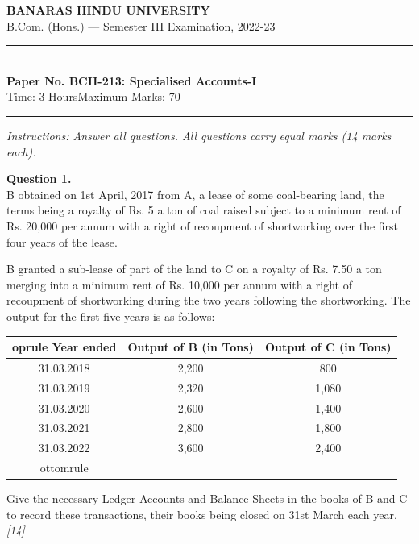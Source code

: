 \documentclass[11pt,a4paper]{article}
\newcommand{\pts}[1]{\hfill   \textit{[#1]}}
\begin{document}
\begin{center}
  {\large\bfseries BANARAS HINDU UNIVERSITY}\\[2pt]
  {\normalsize B.Com. (Hons.) --- Semester III Examination, 2022-23}\\[6pt]
  \rule{0.8\linewidth}{0.5pt}\\[6pt]
  {\large\bfseries Paper No. BCH-213: Specialised Accounts-I}\\[4pt]
  {\normalsize Time: 3 Hours\hfill Maximum Marks: 70}
\end{center}

\rule{\linewidth}{0.4pt}

\smallskip



\noindent   \textit{Instructions: Answer all questions. All questions carry equal marks (14 marks each).}

\bigskip




\noindent   \textbf{Question 1.} \\
B obtained on 1st April, 2017 from A, a lease of some coal-bearing land, the terms being a royalty of Rs. 5 a ton of coal raised subject to a minimum rent of Rs. 20,000 per annum with a right of recoupment of shortworking over the first four years of the lease.

B granted a sub-lease of part of the land to C on a royalty of Rs. 7.50 a ton merging into a minimum rent of Rs. 10,000 per annum with a right of recoupment of shortworking during the two years following the shortworking. The output for the first five years is as follows:


\begin{center}
  
\begin{tabular}{ccc}
     oprule
   \textbf{Year ended} &   \textbf{Output of B (in Tons)} &   \textbf{Output of C (in Tons)} \\
    \midrule
    31.03.2018 & 2,200 & 800 \\
    31.03.2019 & 2,320 & 1,080 \\
    31.03.2020 & 2,600 & 1,400 \\
    31.03.2021 & 2,800 & 1,800 \\
    31.03.2022 & 3,600 & 2,400 \\
    ottomrule
  \end{tabular}
\end{center}

Give the necessary Ledger Accounts and Balance Sheets in the books of B and C to record these transactions, their books being closed on 31st March each year.\pts{14}
\end{document}
